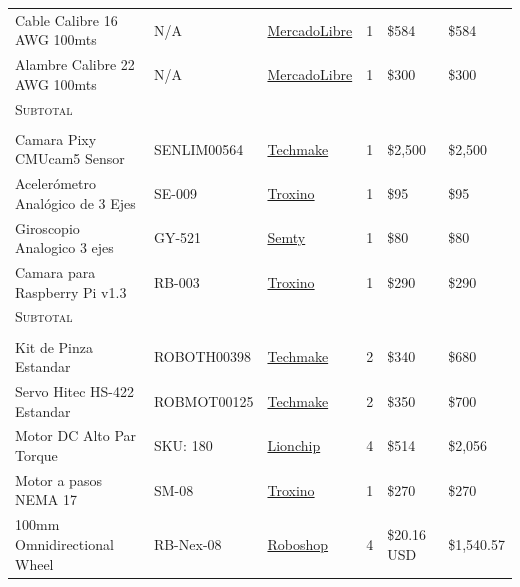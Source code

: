 \documentclass{article}
\begin{document}
\begin{titlingpage}
\begin {table}[H]
\begin{tabular}{llllll}
    \phantom{ZZ}Cable Calibre 16 AWG 100mts &   N/A  & \href{https://articulo.mercadolibre.com.mx/MLM-575742203-rollo-100-mts-cable-thw-calibre-16-kobrex-varios-colores-_JM} {MercadoLibre}  & 1 & \$584 & \$584 \\
    \phantom{ZZ}Alambre Calibre 22 AWG 100mts &   N/A & \href{https://articulo.mercadolibre.com.mx/MLM-550889888-cable-protoboard-100-mts-alambre-estanado-calibre-22-awg-_JM} {MercadoLibre}  & 1 & \$300 & \$300 \\
    \textsc{Subtotal} & & & & & \\
    \midrule
     \\
    \phantom{ZZ} Camara Pixy CMUcam5 Sensor  &   SENLIM00564  &  \href{http://www.techmake.com/00564.html} {Techmake}  & 1 & \$2,500 & \$2,500\\
    \phantom{ZZ} Acelerómetro Analógico de 3 Ejes &   SE-009  &  \href{https://troxino.com/producto/acelerometro-analogico-de-3-ejes-mma7361/34} {Troxino}  & 1 & \$95 & \$95\\
    \phantom{ZZ} Giroscopio Analogico 3 ejes & GY-521 & \href{http://semty.mx/index.php?id_product=2168&controller=product} {Semty}  & 1 & \$80 & \$80\\
    \phantom{ZZ} Camara para Raspberry Pi v1.3  & RB-003 & \href{https://troxino.com/producto/camara-para-raspberry-pi-v1-3-5mp-1080p/57} {Troxino}  & 1 & \$290 & \$290\\
    \textsc{Subtotal} & & & & & \\
    \midrule
     \\
    \phantom{ZZ}Kit de Pinza Estandar &  ROBOTH00398  &  \href{http://www.techmake.com/productos/robotica/robotica-otros/00398.html} {Techmake}  & 2 & \$340 & \$680\\
    \phantom{ZZ}Servo Hitec HS-422 Estandar &  ROBMOT00125  &  \href{http://www.techmake.com/00125.html} {Techmake}  & 2 & \$350 & \$700\\
    \phantom{ZZ}Motor DC Alto Par Torque &  SKU: 180  &  \href{https://www.lionchipmexico.com/product-page/motor-dc-alto-par-torque-43-kg-12v-47-rpm-robot-32-mm} {Lionchip}  & 4 & \$514 & \$2,056\\
    \phantom{ZZ}Motor a pasos NEMA 17 &   SM-08  &  \href{https://troxino.com/producto/motor-a-pasos-nema-17-17hs4401-4kg-cm/123} {Troxino}  & 1 & \$270 & \$270\\
    \phantom{ZZ}100mm Omnidirectional Wheel &  RB-Nex-08  &  \href{https://www.robotshop.com/en/100mm-omnidirectional-wheel-brass-bearing-rollers.html} {Roboshop}  & 4 & \$20.16 USD & \$1,540.57\\

\end{tabular}
\end{table}
\end{titlingpage}
\end{document}

